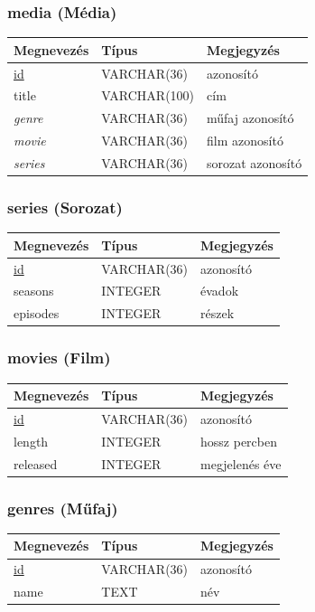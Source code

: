 \documentclass[12pt,a4paper,titlepage]{article}  %
\begin{document}
\subsubsection{media (Média)}
\begin{tabular}{|l|l|l|}
	\hline
	Megnevezés & Típus & Megjegyzés \\
	\hline
	\underline{id} & VARCHAR(36) & azonosító \\
	\hline
	title & VARCHAR(100) & cím \\
	\hline
	\textit{genre} & VARCHAR(36) & műfaj azonosító \\
	\hline
	\textit{movie} & VARCHAR(36) & film azonosító \\
	\hline
	\textit{series} & VARCHAR(36) & sorozat azonosító \\
	\hline
\end{tabular}

\subsubsection{series (Sorozat)}
\begin{tabular}{|l|l|l|}
	\hline
	Megnevezés & Típus & Megjegyzés \\
	\hline
	\underline{id} & VARCHAR(36) & azonosító \\
	\hline
	seasons & INTEGER & évadok \\
	\hline
	episodes & INTEGER & részek \\
	\hline
\end{tabular}

\subsubsection{movies (Film)}
\begin{tabular}{|l|l|l|}
	\hline
	Megnevezés & Típus & Megjegyzés \\
	\hline
	\underline{id} & VARCHAR(36) & azonosító \\
	\hline
	length & INTEGER & hossz percben \\
	\hline
	released & INTEGER & megjelenés éve \\
	\hline
\end{tabular}

\subsubsection{genres (Műfaj)}
\begin{tabular}{|l|l|l|}
	\hline
	Megnevezés & Típus & Megjegyzés \\
	\hline
	\underline{id} & VARCHAR(36) & azonosító \\
	\hline
	name & TEXT & név \\
	\hline
\end{tabular}
\end{document}
